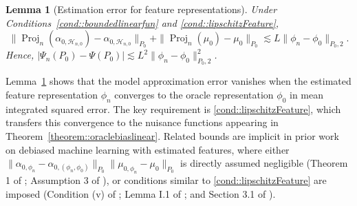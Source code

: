 \documentclass[11pt]{article}
\newtheorem{lemma}{Lemma}
\theoremstyle{definition}
\begin{document}
 
\begin{lemma}[Estimation error for feature representations]
\label{lemma::lipschitzdependent}
Under Conditions~\ref{cond::boundedlinearfun} and \ref{cond::lipschitzFeature},
\[
\|\operatorname{Proj}_n(\alpha_{0,\mathcal{H}_{n,0}})-\alpha_{0,\mathcal{H}_{n,0}}\|_{P_0}
+
\|\operatorname{Proj}_n(\mu_0)-\mu_0\|_{P_0}
\lesssim
L \|\phi_n-\phi_0\|_{P_0,2}.
\]
Hence, $|\Psi_n(P_0)-\Psi(P_0)|
\lesssim
L^2 \|\phi_n-\phi_0\|_{P_0,2}^2$.
\end{lemma}

Lemma~\ref{lemma::lipschitzdependent} shows that the model approximation error vanishes when the estimated feature representation \(\phi_n\) converges to the oracle representation \(\phi_0\) in mean integrated squared error. The key requirement is \ref{cond::lipschitzFeature}, which transfers this convergence to the nuisance functions appearing in Theorem~\ref{theorem::oraclebiaslinear}. Related bounds are implicit in prior work on debiased machine learning with estimated features, where either \(\|\alpha_{0,\phi_n}-\alpha_{0,(\phi_n,\phi_0)}\|_{P_0}\|\mu_{0,\phi_n}-\mu_0\|_{P_0}\) is directly assumed negligible (Theorem 1 of \cite{ATEsupereff}; Assumption 3 of \cite{dukes2024doubly}), or conditions similar to \ref{cond::lipschitzFeature} are imposed (Condition (v)  of \cite{ATEsupereff}; Lemma I.1 of \cite{wang2023super}; and Section 3.1 of \cite{bonvini2024doubly}).

 
 
 
\end{document}
